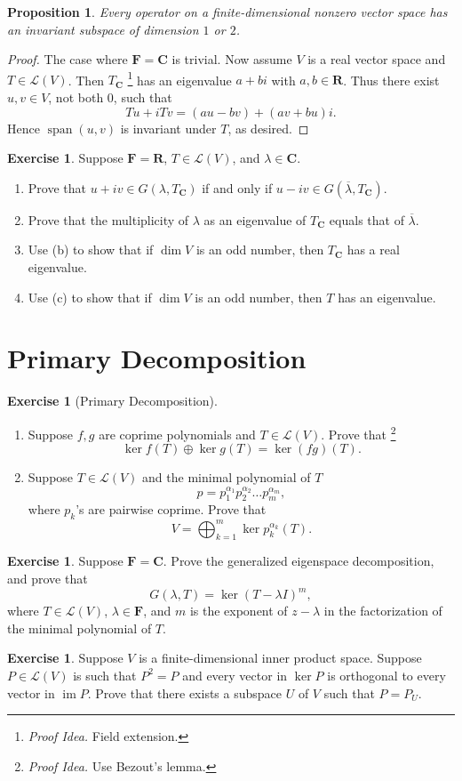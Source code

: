 \documentclass[nofonts,colorlinks]{tufte-handout}
\theoremstyle{plain} %
\newtheorem{prop}[thm]{Proposition}
\theoremstyle{definition}
\newtheorem{exer}[thm]{Exercise}
\theoremstyle{remark}
\def\idea{\textit{\color[rgb]{0,0,.55}Proof Idea. }}
\newcommand{\R}{\mathbf{R}}
\newcommand{\C}{\mathbf{C}}
\newcommand{\F}{\mathbf{F}}
\renewcommand{\L}{\mathcal{L}}
\DeclareMathOperator{\spn}{span}
\DeclareMathOperator{\im}{im}
\begin{document}
\begin{prop}
	Every operator on a finite-dimensional nonzero vector space has an invariant subspace of dimension $1$ or $2$.
\end{prop}
\begin{proof}
	The case where $\F=\C$ is trivial. Now assume $V$ is a real vector space and $T\in\L(V)$. Then $T_{\C}$%
	\footnote{\idea Field extension.}
	has an eigenvalue $a+bi$ with $a,b\in\R$. Thus there exist $u,v\in V$, not both $0$, such that
	\[Tu+iTv=(au-bv)+(av+bu)i.\]
	Hence $\spn(u,v)$ is invariant under $T$, as desired.
\end{proof}

\begin{exer}
	Suppose $\F=\R$, $T\in\L(V)$, and $\lambda\in\C$.
	\begin{enumerate}
		\item Prove that $u+iv\in G(\lambda,T_\C)$ if and only if $u-iv\in G(\overline{\lambda}, T_\C)$.
		\item Prove that the multiplicity of $\lambda$ as an eigenvalue of $T_\C$ equals that of $\overline{\lambda}$.
		\item Use (b) to show that if $\dim V$ is an odd number, then $T_\C$ has a real eigenvalue.
		\item Use (c) to show that if $\dim V$ is an odd number, then $T$ has an eigenvalue.
	\end{enumerate}
\end{exer}


\section{Primary Decomposition}
\begin{exer}[Primary Decomposition]
	\begin{enumerate}
		\item Suppose $f,g$ are coprime polynomials and $T\in\L(V)$. Prove that%
		\footnote{\idea Use Bezout's lemma.}
		\[\ker f(T)\oplus\ker g(T)=\ker(fg)(T).\]
		\item Suppose $T\in\L(V)$ and the minimal polynomial of $T$
		\[p=p_1^{\alpha_1}p_2^{\alpha_2}\dots p_m^{\alpha_m},\]
		where $p_k$'s are pairwise coprime. Prove that
		\[V=\bigoplus_{k=1}^m\ker p_k^{\alpha_k}(T).\]
	\end{enumerate}
\end{exer}

\begin{exer}
	Suppose $\F=\C$. Prove the generalized eigenspace decomposition, and prove that
	\[G(\lambda,T)=\ker(T-\lambda I)^m,\]
	where $T\in\L(V)$, $\lambda\in\F$, and $m$ is the exponent of $z-\lambda$ in the factorization of the minimal polynomial of $T$.
\end{exer}

\begin{exer}
	Suppose $V$ is a finite-dimensional inner product space. Suppose $P\in\L(V)$ is such that $P^2=P$ and every vector in $\ker P$ is orthogonal to every vector in $\im P$. Prove that there exists a subspace $U$ of $V$ such that $P=P_U$.
\end{exer}
\end{document}
